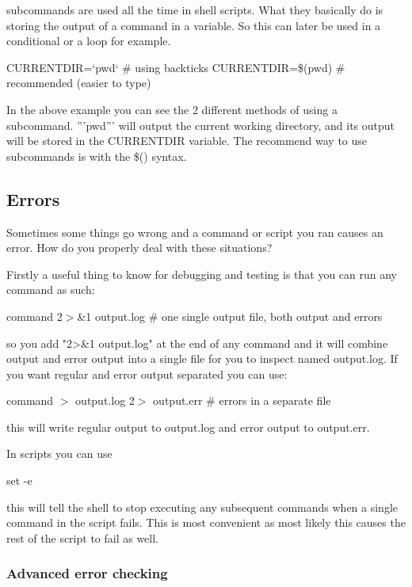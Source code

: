 subcommands are used all the time in shell scripts. What they basically do is
storing the output of a command in a variable. So this can later be used in a
conditional or a loop for example.

\begin{prompt}
  CURRENTDIR=`pwd`  # using backticks
  CURRENTDIR=\$(pwd)  # recommended (easier to type)
\end{prompt}

In the above example you can see the 2 different methods of using a subcommand.
'''pwd''' will output the current working directory, and its output will be
stored in the CURRENTDIR variable.  The recommend way to use subcommands is with
the \$() syntax.

\subsection{Errors}

Sometimes some things go wrong and a command or script you ran causes an error.
How do you properly deal with these situations?

Firstly a useful thing to know for debugging and testing is that you can run any
command as such:

\begin{prompt}
command 2$>$&1 output.log   # one single output file, both output and errors
\end{prompt}

so you add "2>&1 output.log" at the end of any command and it will combine
output and error output into a single file for you to inspect named output.log.
If you want regular and error output separated you can use:

\begin{prompt}
command $>$ output.log 2$>$ output.err  # errors in a separate file
\end{prompt}

this will write regular output to output.log and error output to output.err.

In scripts you can use

\begin{prompt}
set -e
\end{prompt}

this will tell the shell to stop executing any subsequent commands when a single
command in the script fails. This is most convenient as most likely this causes
the rest of the script to fail as well.

\subsubsection{Advanced error checking}

